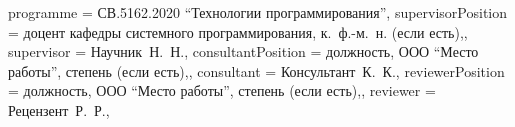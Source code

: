{    %
    programme          = {СВ.5162.2020 \enquote{Технологии программирования}},
    supervisorPosition = {доцент кафедры системного программирования, к.~ф.-м.~н. (если есть),},
    supervisor         = {Научник~Н.~Н.},
    consultantPosition = {должность, ООО \enquote{Место работы}, степень  (если есть),},
    consultant         = {Консультант~К.~К.},
    reviewerPosition   = {должность, ООО \enquote{Место работы}, степень (если есть),},
    reviewer           = {Рецензент~Р.~Р.},
}

